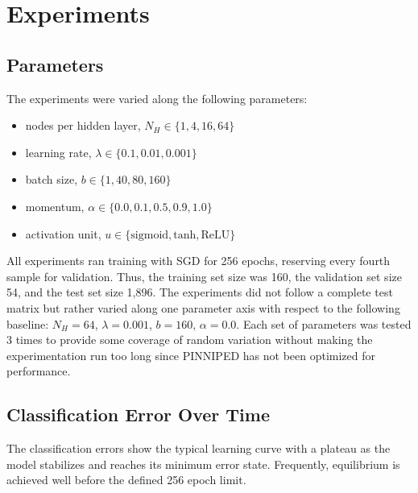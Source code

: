 \documentclass[10pt,epsf]{article}
\begin{document}
\section{Experiments}{
  \subsection{Parameters}{
    The experiments were varied along the following parameters:
    \begin{itemize}
    \item{nodes per hidden layer, $N_H \in \{1, 4, 16, 64\}$}
    \item{learning rate, $\lambda \in \{0.1, 0.01, 0.001\}$}
    \item{batch size, $b \in \{1, 40, 80, 160\}$}
    \item{momentum, $\alpha \in \{0.0, 0.1, 0.5, 0.9, 1.0\}$}
    \item{activation unit, $u \in \{\text{sigmoid}, \text{tanh}, \text{ReLU}\}$}
    \end{itemize}
    All experiments ran training with SGD for 256 epochs, reserving every fourth sample for validation.
    Thus, the training set size was 160, the validation set size 54, and the test set size 1,896.
    The experiments did not follow a complete test matrix but rather varied along one parameter axis
    with respect to the following baseline: $N_H = 64$, $\lambda = 0.001$, $b = 160$, $\alpha = 0.0$.
    Each set of parameters was tested 3 times to provide some coverage of random variation without
    making the experimentation run too long since PINNIPED has not been optimized for performance.
  }
  \subsection{Classification Error Over Time}{
    The classification errors show the typical learning curve with a plateau as the model stabilizes
    and reaches its minimum error state. Frequently, equilibrium is achieved well before the defined
    256 epoch limit.
}}
\end{document}
